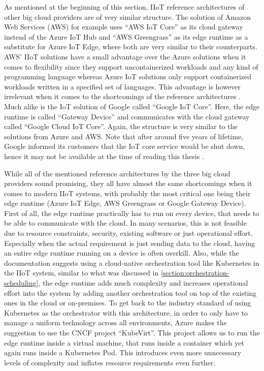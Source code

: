     As mentioned at the beginning of this section, IIoT reference architectures of other big cloud providers are of very similar structure. The solution of Amazon Web Services (AWS) for example uses ``AWS IoT Core'' as its cloud gateway instead of the Azure IoT Hub and ``AWS Greengrass'' as its edge runtime as a substitute for Azure IoT Edge, where both are very similar to their counterparts. AWS' IIoT solutions have a small advantage over the Azure solutions when it comes to flexibility since they support uncontainerized workloads and any kind of programming language whereas Azure IoT solutions only support containerized workloads written in a specified set of languages. This advantage is however irrelevant when it comes to the shortcomings of the reference architectures \cite{greengrass_vs_iot_edge}. Much alike is the IoT solution of Google called ``Google IoT Core''. Here, the edge runtime is called ``Gateway Device'' and communicates with the cloud gateway called ``Google Cloud IoT Core''. Again, the structure is very similar to the solutions from Azure and AWS. Note that after around five years of lifetime, Google informed its customers that the IoT core service would be shut down, hence it may not be available at the time of reading this thesis \cite{google_iot_core_eol}. \newline 

    While all of the mentioned reference architectures by the three big cloud providers sound promising, they all have almost the same shortcomings when it comes to modern IIoT systems, with probably the most critical one being their edge runtime (Azure IoT Edge, AWS Greengrass or Google Gateway Device). First of all, the edge runtime practically has to run on every device, that needs to be able to communicate with the cloud. In many scenarios, this is not feasible due to resource constraints, security, existing software or just operational effort. Especially when the actual requirement is just sending data to the cloud, having an entire edge runtime running on a device is often overkill. Also, while the documentation suggests using a cloud-native orchestration tool like Kubernetes in the IIoT system, similar to what was discussed in \autoref{section:orchestration-scheduling}, the edge runtime adds much complexity and increases operational effort into the system by adding another orchestration tool on top of the existing ones in the cloud or on-premises. To get back to the industry standard of using Kubernetes as the orchestrator with this architecture, in order to only have to manage a uniform technology across all environments, Azure makes the suggestion to use the CNCF project ``KubeVirt''. This project allows us to run the edge runtime inside a virtual machine, that runs inside a container which yet again runs inside a Kubernetes Pod. This introduces even more unnecessary levels of complexity and inflates resource requirements even further. 
    
